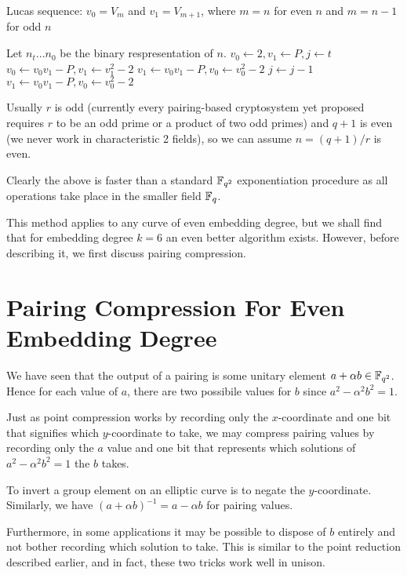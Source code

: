 \begin{algorithm}
\caption {Lucas sequence: $v_0 = V_m$ and $v_1 = V_{m+1}$,
where $m = n$ for even $n$ and $m = n-1$ for odd $n$}
\begin{algorithmic}[1]
\STATE Let $n_t ... n_0$ be the binary respresentation of $n$.
\STATE $v_0 \gets 2, v_1 \gets P, j \gets t$
	\STATE $v_0 \gets v_0 v_1 - P, v_1 \gets v_1^2 - 2$
    \ELSE
	\STATE $v_1 \gets v_0 v_1 - P, v_0 \gets v_0^2 - 2$
    \ENDIF
    \STATE $j \gets j - 1$
\ENDWHILE
\STATE $v_1 \gets v_0 v_1 - P, v_0 \gets v_0^2 - 2$
\end{algorithmic}
\end{algorithm}

Usually $r$ is odd (currently every pairing-based cryptosystem yet
proposed requires $r$ to be an odd prime or a product of two odd primes)
and $q + 1$ is even (we never work in characteristic 2 fields), so we
can assume $n = (q + 1) / r$ is even.

Clearly the above is faster than a standard $\mathbb{F}_{q^2}$ exponentiation
procedure as all operations take place in the smaller field $\mathbb{F}_q$.

This method applies to any curve of even embedding degree, but we shall
find that for embedding degree $k = 6$ an even better algorithm exists.
However, before describing it, we first discuss pairing compression.

\section {Pairing Compression For Even Embedding Degree}

We have seen that the output of a pairing is some unitary element
$a + \alpha b \in \mathbb{F}_{q^2}$.
Hence for each value of $a$, there are two possibile values for $b$
since $a^2 - \alpha^2 b^2 = 1$.

Just as point compression works by recording only the $x$-coordinate and
one bit that signifies which $y$-coordinate to take, we may compress pairing
values by recording only the $a$ value and one bit that represents which
solutions of $a^2 - \alpha^2 b^2 = 1$ the $b$ takes.

To invert a group element on an elliptic curve is to negate the $y$-coordinate.
Similarly, we have $(a + \alpha b)^{-1} = a - \alpha b$ for pairing values.

Furthermore, in some applications it may
be possible to dispose of $b$ entirely and not bother recording which solution
to take. This is similar to the point reduction described earlier, and
in fact, these two tricks work well in unison.

